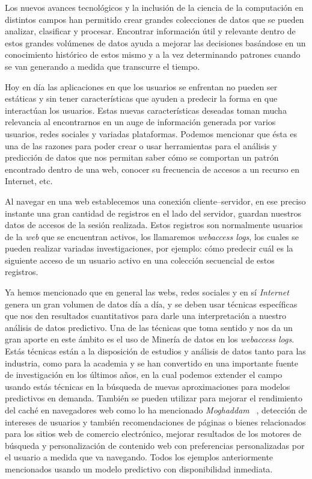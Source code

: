 {
Los nuevos avances tecnológicos y la inclusión de la ciencia de la computación en distintos campos han permitido crear grandes colecciones de datos que se pueden analizar, clasificar y procesar. Encontrar información útil y relevante dentro de estos grandes volúmenes de datos ayuda a mejorar las decisiones basándose en un conocimiento histórico de estos mismo y a la vez determinando patrones cuando se van generando a medida que transcurre el tiempo. 


Hoy en día las aplicaciones en que los usuarios se enfrentan no pueden ser estáticas y sin tener características que ayuden a predecir la forma en que interactúan los usuarios. Estas nuevas características deseadas toman mucha relevancia al encontrarnos en un auge de información generada por varios usuarios, redes sociales y variadas plataformas. Podemos mencionar que ésta es una de las razones para poder  crear o usar  herramientas para el análisis y predicción de datos que nos permitan saber cómo se comportan un patrón encontrado dentro de una web, conocer su frecuencia de accesos a un recurso en Internet, etc.

Al navegar en una web establecemos una conexión {cliente--servidor}, en ese preciso instante una gran cantidad de registros en el lado del servidor, guardan nuestros datos de accesos de la sesión realizada. Estos registros  son normalmente usuarios de la \emph{web}  que se encuentran activos, los llamaremos \emph{webaccess logs},  los cuales se pueden realizar variadas investigaciones, por ejemplo:  cómo predecir cuál es la siguiente acceso de un usuario activo en una colección secuencial de estos registros. 

Ya hemos mencionado  que  en general las webs, redes sociales y en sí \emph{Internet} genera un gran volumen de datos día a día, y se deben usar técnicas específicas que nos den resultados cuantitativos para darle una interpretación a nuestro análisis de datos predictivo. Una de las técnicas que toma sentido y nos da un gran aporte en este ámbito es el uso de Minería de datos  en los \emph{webaccess logs}.  Estás técnicas están a la disposición  de estudios y análisis de datos tanto para las industria, como para la academia y  se han convertido en una importante fuente de investigación en los últimos años, en la cual podemos extender el campo usando estás técnicas en la búsqueda de nuevas aproximaciones para modelos predictivos en demanda. También se pueden utilizar para mejorar el rendimiento del caché en navegadores web como lo ha mencionado \emph{Moghaddam} \etal~\cite{Moghaddam2009},  detección de intereses de usuarios y también recomendaciones de páginas o bienes relacionados para los sitios {web} de comercio electrónico, mejorar  resultados de los motores de búsqueda y personalización de contenido web con preferencias personalizadas por el usuario a medida que va navegando. Todos los ejemplos anteriormente mencionados usando un modelo predictivo con disponibilidad inmediata.



}
